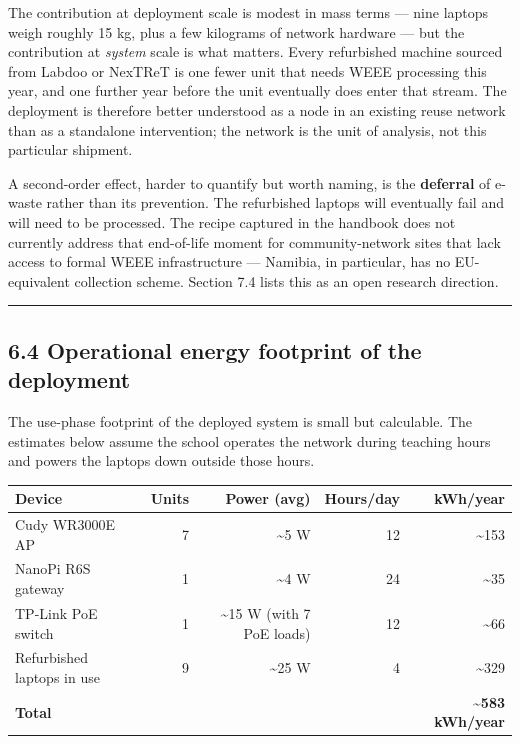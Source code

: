 The contribution at deployment scale is modest in mass terms --- nine
laptops weigh roughly 15 kg, plus a few kilograms of network hardware
--- but the contribution at \emph{system} scale is what matters. Every
refurbished machine sourced from Labdoo or NexTReT is one fewer unit
that needs WEEE processing this year, and one further year before the
unit eventually does enter that stream. The deployment is therefore
better understood as a node in an existing reuse network than as a
standalone intervention; the network is the unit of analysis, not this
particular shipment.

A second-order effect, harder to quantify but worth naming, is the
\textbf{deferral} of e-waste rather than its prevention. The refurbished
laptops will eventually fail and will need to be processed. The recipe
captured in the handbook does not currently address that end-of-life
moment for community-network sites that lack access to formal WEEE
infrastructure --- Namibia, in particular, has no EU-equivalent
collection scheme. Section 7.4 lists this as an open research direction.

\begin{center}\rule{0.5\linewidth}{0.5pt}\end{center}

\hypertarget{operational-energy-footprint-of-the-deployment}{%
\subsection{6.4 Operational energy footprint of the
deployment}\label{operational-energy-footprint-of-the-deployment}}

The use-phase footprint of the deployed system is small but calculable.
The estimates below assume the school operates the network during
teaching hours and powers the laptops down outside those hours.

\begin{longtable}[]{@{}lrrrr@{}}
\toprule\noalign{}
Device & Units & Power (avg) & Hours/day & kWh/year \\
\midrule\noalign{}
\endhead
\bottomrule\noalign{}
\endlastfoot
Cudy WR3000E AP & 7 & \textasciitilde5 W & 12 & \textasciitilde153 \\
NanoPi R6S gateway & 1 & \textasciitilde4 W & 24 & \textasciitilde35 \\
TP-Link PoE switch & 1 & \textasciitilde15 W (with 7 PoE loads) & 12 &
\textasciitilde66 \\
Refurbished laptops in use & 9 & \textasciitilde25 W & 4 &
\textasciitilde329 \\
\textbf{Total} & & & & \textbf{\textasciitilde583 kWh/year} \\
\end{longtable}

